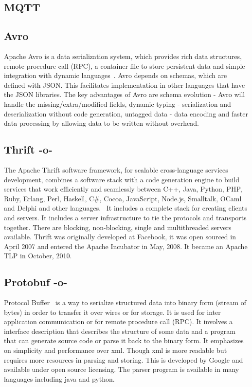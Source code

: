 \subsection{MQTT}

\subsection{Avro}

Apache Avro is a data serialization system, which provides rich data
structures, remote procedure call (RPC), a container file to store
persistent data and simple integration with dynamic
languages~\cite{www-Avro}.  Avro depends on schemas, which are defined
with JSON. This facilitates implementation in other languages that
have the JSON libraries.  The key advantages of Avro are schema
evolution - Avro will handle the missing/extra/modified fields,
dynamic typing - serialization and deserialization without code
generation, untagged data - data encoding and faster data processing
by allowing data to be written without overhead.
     
\subsection{Thrift -o-}

The Apache Thrift software framework, for scalable cross-language
services development, combines a software stack with a code generation
engine to build services that work efficiently and seamlessly between
C++, Java, Python, PHP, Ruby, Erlang, Perl, Haskell, C\#, Cocoa,
JavaScript, Node.js, Smalltalk, OCaml and Delphi and other
languages.~\cite{paper-thrift} It includes a complete stack for
creating clients and servers. It includes a server infrastructure to
tie the protocols and transports together. There are blocking,
non-blocking, single and multithreaded servers available.  Thrift was
originally developed at Facebook, it was open sourced in April 2007
and entered the Apache Incubator in May, 2008. It became an Apache TLP
in October, 2010.~\cite{www-thrift}
     
\subsection{Protobuf -o-}

Protocol Buffer~\cite{www-protobuf} is a way to serialize structured
data into binary form (stream of bytes) in order to transfer it over
wires or for storage. It is used for inter application communication
or for remote procedure call (RPC). It involves a interface
description that describes the structure of some data and a program
that can generate source code or parse it back to the binary form. It
emphasizes on simplicity and performance over xml. Though xml is more
readable but requires more resources in parsing and storing.  This is
developed by Google and available under open source licensing. The
parser program is available in many languages including java and
python.

